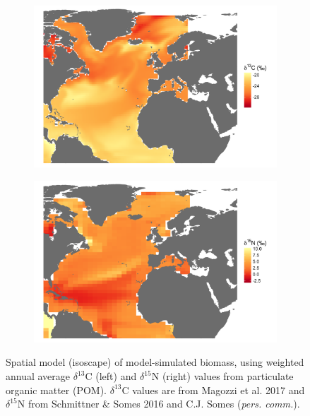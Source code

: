 \documentclass[a4paper,12pt]{article}
\begin{document}
\begin{figure}[!htbp]
    \centering
    \begin{subfigure}[t]{0.45\textwidth}
        \centering
        \includegraphics[width=\linewidth]{figures/Figure-S3-plankton-d13C-map.png} 
    \end{subfigure}
    \hfill
    \begin{subfigure}[t]{0.45\textwidth}
        \centering
        \includegraphics[width=\linewidth]{figures/Figure-S3-plankton-d15N-map.png} 
    \end{subfigure}
    \caption{Spatial model (isoscape) of model-simulated biomass, using weighted annual average $\delta^{13}$C (left) and $\delta^{15}$N (right) values from particulate organic matter (POM). $\delta^{13}$C values are from Magozzi et al. 2017\cite{magozzi2017using} and $\delta^{15}$N from Schmittner \& Somes 2016\cite{schmittner2016complementary} and C.J. Somes (\textit{pers. comm.}).} 
    \label{figs3}
\end{figure}
\end{document}
